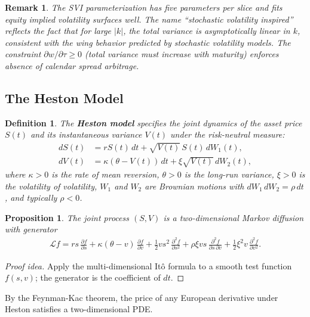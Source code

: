 \documentclass{report}
\theoremstyle{spacedplain}
\newtheorem{proposition}[theorem]{Proposition}
\theoremstyle{spaceddefinition}
\newtheorem{definition}[theorem]{Definition}
\theoremstyle{spacedremark}
\newtheorem{remark}[theorem]{Remark}
\begin{document}
\begin{remark}
The SVI parameterization has five parameters per slice and fits equity implied volatility surfaces well. The name ``stochastic volatility inspired'' reflects the fact that for large $|k|$, the total variance is asymptotically linear in $k$, consistent with the wing behavior predicted by stochastic volatility models. The constraint $\partial w/\partial \tau \geq 0$ (total variance must increase with maturity) enforces absence of calendar spread arbitrage.
\end{remark}


\subsection{The Heston Model}

\begin{definition}
The \textbf{Heston model} specifies the joint dynamics of the asset price $S(t)$ and its instantaneous variance $V(t)$ under the risk-neutral measure:
\begin{align}
    dS(t) &= rS(t)\,dt + \sqrt{V(t)}\,S(t)\,dW_1(t), \\
    dV(t) &= \kappa(\theta - V(t))\,dt + \xi\sqrt{V(t)}\,dW_2(t),
\end{align}
where $\kappa > 0$ is the rate of mean reversion, $\theta > 0$ is the long-run variance, $\xi > 0$ is the volatility of volatility, $W_1$ and $W_2$ are Brownian motions with $dW_1\,dW_2 = \rho\,dt$, and typically $\rho < 0$.
\end{definition}

\begin{proposition}
The joint process $(S,V)$ is a two-dimensional Markov diffusion with generator
\begin{align}
    \mathcal{L}f = rs\,\frac{\partial f}{\partial s} + \kappa(\theta-v)\,\frac{\partial f}{\partial v} + \frac{1}{2}vs^2\,\frac{\partial^2 f}{\partial s^2} + \rho\xi vs\,\frac{\partial^2 f}{\partial s\,\partial v} + \frac{1}{2}\xi^2 v\,\frac{\partial^2 f}{\partial v^2}.
\end{align}
\end{proposition}

\begin{proof}[Proof idea]
Apply the multi-dimensional It\^o formula to a smooth test function $f(s,v)$; the generator is the coefficient of $dt$.
\end{proof}

By the Feynman-Kac theorem, the price of any European derivative under Heston satisfies a two-dimensional PDE.
\end{document}
